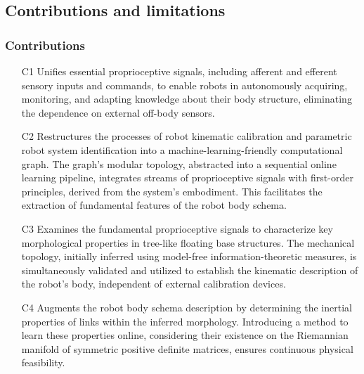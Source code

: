 \documentclass[12pt, a4paper]{article}
\newcommand{\redtext}[1]{\textcolor{red}{#1}}
\begin{document}

\subsection*{Contributions and limitations}

\subsubsection*{Contributions}

\begin{itemize}
	\item[C1] Unifies essential proprioceptive signals, including afferent and efferent sensory inputs and commands, to enable robots in autonomously acquiring, monitoring, and adapting knowledge about their body structure, eliminating the dependence on external off-body sensors.
	\item[C2] Restructures the processes of robot kinematic calibration and parametric robot system identification into a machine-learning-friendly computational graph. The graph's modular topology, abstracted into a sequential online learning pipeline, integrates streams of proprioceptive signals with first-order principles, derived from the system's embodiment. This facilitates the extraction of fundamental features of the robot body schema.
	\item[C3]  Examines the fundamental proprioceptive signals to characterize key morphological properties in tree-like floating base structures. The mechanical topology, initially inferred using model-free information-theoretic measures, is simultaneously validated and utilized to establish the kinematic description of the robot's body, independent of external calibration devices.
	\item[C4] Augments the robot body schema description by determining the inertial properties of links within the inferred morphology. Introducing a method to learn these properties online, considering their existence on the Riemannian manifold of symmetric positive definite matrices, ensures continuous physical feasibility.
\end{itemize}
\end{document}
